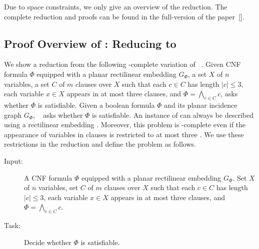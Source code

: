 \ifConf
Due to space constraints, we only give an overview of the reduction. The complete reduction and proofs can be found in the full-version of the paper~[].
\fi
\subsection[Proof Overview of \texorpdfstring{\Cref{thm:edgeless_np_hard}}{}]{Proof Overview of \texorpdfstring{}{}: Reducing {\pthreesat} to {\ggedmm}}
\ifConf
    We show a reduction from the following \NP-complete variation of {\pthreesat}~\cite{Lichtenstein1982,Knuth1992,Tovey1984}.
    Given CNF formula $\Phi$ equipped with a planar rectilinear embedding $G_\Phi$, a set $X$ of $n$ variables, a set $C$ of $m$ clauses over $X$ such that each $c \in C$ has length $|c| \le 3$, each variable $x \in X$ appears in at most three clauses, and $\Phi = \bigwedge_{c\in C} c$, {\pthreesat} asks whether $\Phi$ is satisfiable.
\fi
\ifFull
Given a boolean formula $\Phi$ and its planar incidence graph $G_{\Phi}$, {\pthreesat}~\cite{Lichtenstein1982} asks whether $\Phi$ is satisfiable. 
An instance of {\pthreesat} can always be described using a rectilinear embedding \cite{Knuth1992}.
Moreover, this problem is \NP-complete even if the appearance of variables in clauses is restricted to at most three \cite{Tovey1984}.
We use these restrictions in the reduction and define the problem as follows.
\begin{itembox}[l]{{\pthreesat}}
    \begin{description}%
        \item[Input:] A CNF formula $\Phi$ equipped with a planar rectilinear embedding $G_\Phi$. Set $X$ of $n$ variables, set $C$ of $m$ clauses over $X$ such that each $c \in C$ has length $|c| \le 3$, each variable $x \in X$ appears in at most three clauses, and $\Phi = \bigwedge_{c\in C} c$.
        \item[Task:] Decide whether $\Phi$ is satisfiable.
    \end{description}
\end{itembox}
\fi
\ifFull
